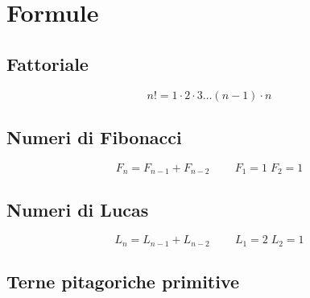 \chapter{Formule}
\section{Fattoriale}
\begin{equation}
n!=1\cdot 2\cdot 3\dots (n-1)\cdot n
\end{equation}
\section{Numeri di Fibonacci}
\begin{equation}
F_n=F_{n-1}+F_{n-2}\qquad\ F_{1}=1\; F_{2}=1 
\end{equation}
\section{Numeri di Lucas}
\begin{equation}
L_n=L_{n-1}+L_{n-2}\qquad\ L_{1}=2\; L_{2}=1 
\end{equation}
\section{Terne pitagoriche primitive}
